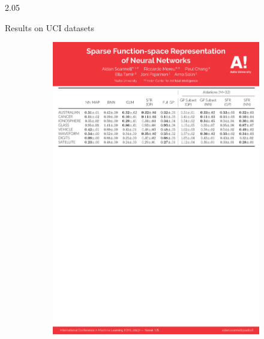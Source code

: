 \documentclass[final,12pt]{beamer}
\newcommand{\our}{SFR}
\newlength{\colwidth}
\begin{document}
\begin{frame}[t]
\begin{columns}
\begin{column}{2.05\colwidth}
\begin{block}{Results on UCI datasets}


\begin{figure}
\centering
\begin{subfigure}[b]{0.5\textwidth}\centering
	\includegraphics[scale=0.5]{fig/table.pdf}	
\end{subfigure}\hspace{2cm}

\end{figure}
\end{block}
\end{column}
\end{columns}
\end{frame}
\end{document}
